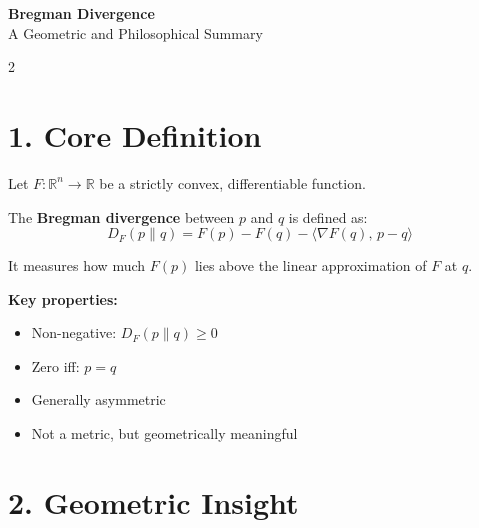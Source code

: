 \documentclass[11pt,a4paper]{article}
\begin{document}
\begin{center}
    {\huge \bfseries \color{myblue} Bregman Divergence}\\[0.2cm]
    {\large \color{mygreen} A Geometric and Philosophical Summary}
\end{center}

\vspace{0.4cm}
\begin{multicols}{2}

\section{1. Core Definition}

Let \( F : \mathbb{R}^n \to \mathbb{R} \) be a strictly convex, differentiable function.

The \textbf{Bregman divergence} between \( p \) and \( q \) is defined as:
\[
D_F(p \parallel q) = F(p) - F(q) - \langle \nabla F(q),\, p - q \rangle
\]

\begin{tcolorbox}
It measures how much \( F(p) \) lies above the linear approximation of \( F \) at \( q \).
\end{tcolorbox}

\textbf{Key properties:}
\begin{itemize}[leftmargin=0.6cm]
  \item Non-negative: \( D_F(p \parallel q) \ge 0 \)
  \item Zero iff: \( p = q \)
  \item Generally asymmetric
  \item Not a metric, but geometrically meaningful
\end{itemize}

\section{2. Geometric Insight}

\begin{center}
\end{center}
\end{multicols}
\end{document}
